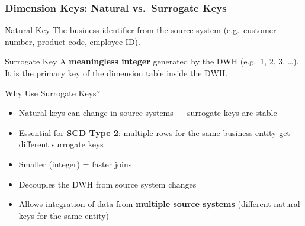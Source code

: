 \begin{frame}
  \frametitle{Dimension Keys: Natural vs.\ Surrogate Keys}

  \begin{block}{Natural Key}
    The business identifier from the source system
    (e.g.\ customer number, product code, employee ID).
  \end{block}

  \begin{block}{Surrogate Key}
    A \textbf{meaningless integer} generated by the DWH (e.g.\ 1, 2, 3, \ldots).
    It is the primary key of the dimension table inside the DWH.
  \end{block}

  \begin{block}{Why Use Surrogate Keys?}
    \begin{itemize}
      \item Natural keys can change in source systems --- surrogate keys are stable
      \item Essential for \textbf{SCD Type 2}: multiple rows for the same business entity
        get different surrogate keys
      \item Smaller (integer) = faster joins
      \item Decouples the DWH from source system changes
      \item Allows integration of data from \textbf{multiple source systems}
        (different natural keys for the same entity)
    \end{itemize}
  \end{block}
\end{frame}


